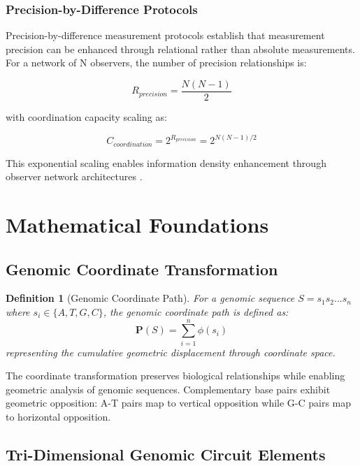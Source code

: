 \documentclass[12pt,a4paper]{article}
\newtheorem{definition}{Definition}
\begin{document}
\subsubsection{Precision-by-Difference Protocols}

Precision-by-difference measurement protocols \cite{sachikonye2024precision} establish that measurement precision can be enhanced through relational rather than absolute measurements. For a network of N observers, the number of precision relationships is:

\begin{equation}
R_{precision} = \frac{N(N-1)}{2}
\end{equation}

with coordination capacity scaling as:

\begin{equation}
C_{coordination} = 2^{R_{precision}} = 2^{N(N-1)/2}
\end{equation}

This exponential scaling enables information density enhancement through observer network architectures \cite{shannon1948mathematical}.

\section{Mathematical Foundations}

\subsection{Genomic Coordinate Transformation}

\begin{definition}[Genomic Coordinate Path]
For a genomic sequence $S = s_1s_2...s_n$ where $s_i \in \{A,T,G,C\}$, the genomic coordinate path is defined as:
\begin{equation}
\mathbf{P}(S) = \sum_{i=1}^n \phi(s_i)
\end{equation}
representing the cumulative geometric displacement through coordinate space.
\end{definition}

The coordinate transformation preserves biological relationships while enabling geometric analysis of genomic sequences. Complementary base pairs exhibit geometric opposition: A-T pairs map to vertical opposition while G-C pairs map to horizontal opposition.

\subsection{Tri-Dimensional Genomic Circuit Elements}
\end{document}
